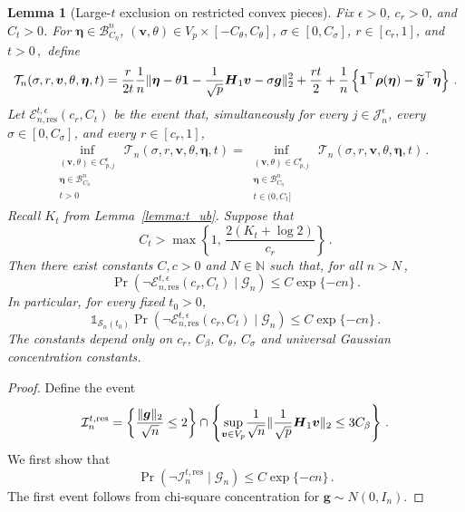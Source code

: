 \documentclass{article}
\makeatletter
\newtheorem{lemma}{Lemma}
\theoremstyle{definition}
\newcommand{\vnorm}[1]{%
	\ensuremath{%
		\if@display
		\left\| #1 \right\|
		\else
		\| #1 \|
		\fi
	}%
}
\newcommand*{\bb}{\boldsymbol}
\def\bH {\bb{H}}
\def\bv{\bb{v}}
\def\bg{\bb{g}}
\def\bYtil{\widetilde{\bb{y}}}
\def\bH{\bb{H}}
\makeatother
\begin{document}
\begin{bibunit}
\begin{lemma}[Large-$t$ exclusion on restricted convex pieces]
\label{lemma:restricted_large_t_pieces}
	Fix $\epsilon>0$, $c_r>0$, and $C_t>0$. For $\bb\eta\in\mathcal B^n_{C_\eta}$, $(\bv,\theta)\in V_p\times[-C_\theta,C_\theta]$, $\sigma\in[0,C_\sigma]$, $r\in[c_r,1]$, and $t>0\,,$
	define
	$$
		\mathcal T_n(\sigma,r,\bv,\theta,\bb\eta,t)
		=
		\frac{r}{2t}
		\frac1n
		\vnorm{
			\bb\eta
			-
			\theta\bb1
			-
			\frac1{\sqrt p}\bH_1\bv
			-
			\sigma\bg
		}_2^2
		+
		\frac{rt}{2}
		+
		\frac1n
		\left\{
			\bb1^\top\bb\rho(\bb\eta)
			-
			\bYtil^\top\bb\eta
		\right\}\,.
	$$
	Let $\mathcal E_{n,\mathrm{res}}^{t,\epsilon}(c_r,C_t)$ be the event
	that, simultaneously for every $j\in\mathcal J_n^\epsilon$, every
	$\sigma\in[0,C_\sigma]$, and every $r\in[c_r,1]$,
	$$
	\begin{aligned}
		&\underset{\substack{(\bv,\theta)\in C_{p,j}^{\epsilon}\\
		\bb\eta\in\mathcal B^n_{C_\eta}\\
		t>0}}{\inf}
		\, \mathcal T_n(\sigma,r,\bv,\theta,\bb\eta,t)
		 =
		\underset{\substack{(\bv,\theta)\in C_{p,j}^{\epsilon}\\
		\bb\eta\in\mathcal B^n_{C_\eta}\\
		t\in(0,C_t]}}{\inf}
		\, \mathcal T_n(\sigma,r,\bv,\theta,\bb\eta,t)\,.
	\end{aligned}
	$$
	Recall $K_t$ from Lemma~\ref{lemma:t_ub}.
	Suppose that
	$$
		C_t>
		\max
		\left\{
			1,\,
			\frac{2(K_t+\log2)}{c_r}
		\right\}\,.
	$$
	Then there exist constants $C,c>0$ and $N\in\mathbb N$ such that, for
	all $n>N$\,,
	$$
		\Pr\left(
			\lnot\mathcal E_{n,\mathrm{res}}^{t,\epsilon}(c_r,C_t)
			\mid
			\mathcal G_n
		\right)
		\leq
		C\exp\{-cn\}\,.
	$$
	In particular, for every fixed $t_0>0$,
	$$
		\mathds{1}_{\mathcal S_n(t_0)}
		\Pr\left(
			\lnot\mathcal E_{n,\mathrm{res}}^{t,\epsilon}(c_r,C_t)
			\mid
			\mathcal G_n
		\right)
		\leq
		C\exp\{-cn\}\,.
	$$
	The constants depend only on
	$c_r$, $C_\beta$, $C_\theta$, $C_\sigma$
	and universal Gaussian concentration constants.
\end{lemma}

\begin{proof}
	Define the event
	$$
		\mathcal I_{n}^{t,\mathrm{res}}
		=
		\left\{
			\frac{\vnorm{\bg}_2}{\sqrt n}\leq 2
		\right\}
		\cap
		\left\{
			\underset{\bv\in V_p}{\sup}
			\frac1{\sqrt n}
			\vnorm{
				\frac1{\sqrt p}\bH_1\bv
			}_2
			\leq
			3C_\beta
		\right\}\,.
	$$
	We first show that
	$$
		\Pr\left(
			\lnot\mathcal I_{n}^{t,\mathrm{res}}
			\mid
			\mathcal G_n
		\right)
		\leq
		C\exp\{-cn\}\,.
	$$
	The first event follows from chi-square concentration
	\citep[Equation~(3.1)]{vershynin:2018} for $\bg\sim N(0,I_n)$.


\end{proof}
\end{bibunit}
\end{document}
